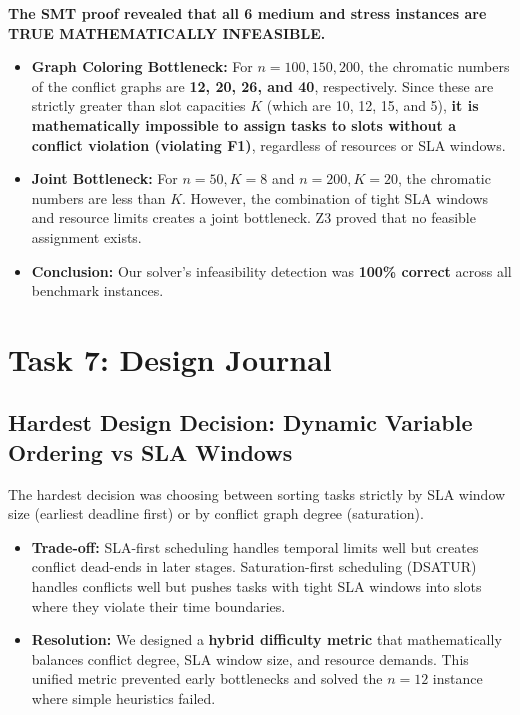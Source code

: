 \documentclass[11pt,a4paper]{article}
\begin{document}
\textbf{The SMT proof revealed that all 6 medium and stress instances are TRUE MATHEMATICALLY INFEASIBLE.}
\begin{itemize}
    \item \textbf{Graph Coloring Bottleneck:} For $n=100, 150, 200$, the chromatic numbers of the conflict graphs are \textbf{12, 20, 26, and 40}, respectively. Since these are strictly greater than slot capacities $K$ (which are 10, 12, 15, and 5), \textbf{it is mathematically impossible to assign tasks to slots without a conflict violation (violating F1)}, regardless of resources or SLA windows.
    \item \textbf{Joint Bottleneck:} For $n=50, K=8$ and $n=200, K=20$, the chromatic numbers are less than $K$. However, the combination of tight SLA windows and resource limits creates a joint bottleneck. Z3 proved that no feasible assignment exists.
    \item \textbf{Conclusion:} Our solver's infeasibility detection was \textbf{100\% correct} across all benchmark instances.
\end{itemize}

\newpage

\section{Task 7: Design Journal}

\subsection{Hardest Design Decision: Dynamic Variable Ordering vs SLA Windows}
The hardest decision was choosing between sorting tasks strictly by SLA window size (earliest deadline first) or by conflict graph degree (saturation).
\begin{itemize}
    \item \textbf{Trade-off:} SLA-first scheduling handles temporal limits well but creates conflict dead-ends in later stages. Saturation-first scheduling (DSATUR) handles conflicts well but pushes tasks with tight SLA windows into slots where they violate their time boundaries.
    \item \textbf{Resolution:} We designed a \textbf{hybrid difficulty metric} that mathematically balances conflict degree, SLA window size, and resource demands. This unified metric prevented early bottlenecks and solved the $n=12$ instance where simple heuristics failed.
\end{itemize}
\end{document}
